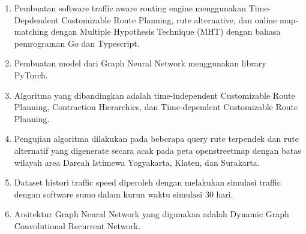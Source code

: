 \begin{enumerate}
    \item Pembuatan software traffic aware routing engine menggunakan Time-Depdendent Customizable Route Planning, rute alternative, dan online map-matching dengan Multiple Hypothesis Technique (MHT) dengan bahasa pemrograman Go dan Typescript.
    \item Pembuatan model dari Graph Neural Network menggunakan library PyTorch.
    \item Algoritma yang dibandingkan adalah time-independent Customizable Route Planning, Contraction Hierarchies, dan Time-dependent Customizable Route Planning.
    \item Pengujian algoritma dilakukan pada beberapa query rute terpendek dan rute alternatif yang digenerate secara acak pada peta openstreetmap dengan batas wilayah area Dareah Istimewa Yogyakarta, Klaten, dan Surakarta. 
    \item Dataset histori traffic speed diperoleh dengan melakukan simulasi traffic dengan software sumo dalam kurun waktu simulasi 30 hari.
    \item Arsitektur Graph Neural Network yang digunakan adalah Dynamic Graph Convolutional Recurrent Network.
\end{enumerate}
